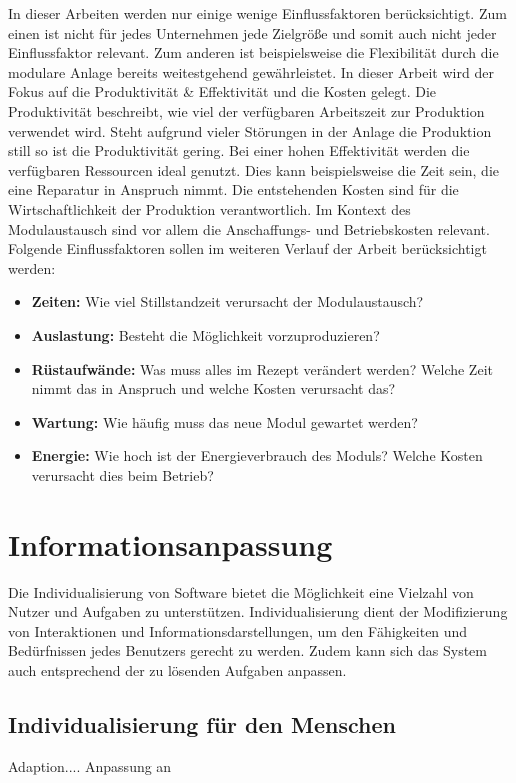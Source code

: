 In dieser Arbeiten werden nur einige wenige Einflussfaktoren berücksichtigt. Zum einen ist nicht für jedes Unternehmen jede Zielgröße und somit auch nicht jeder Einflussfaktor relevant. Zum anderen ist beispielsweise die Flexibilität durch die modulare Anlage bereits weitestgehend gewährleistet. In dieser Arbeit wird der Fokus auf die Produktivität \& Effektivität und die Kosten gelegt. Die Produktivität beschreibt, wie viel der verfügbaren Arbeitszeit zur Produktion verwendet wird. Steht aufgrund vieler Störungen in der Anlage die Produktion still so ist die Produktivität gering. Bei einer hohen Effektivität werden die verfügbaren Ressourcen ideal genutzt. Dies kann beispielsweise die Zeit sein, die eine Reparatur in Anspruch nimmt. Die entstehenden Kosten sind für die Wirtschaftlichkeit der Produktion verantwortlich. Im Kontext des Modulaustausch sind vor allem die Anschaffungs- und Betriebskosten relevant. Folgende Einflussfaktoren sollen im weiteren Verlauf der Arbeit berücksichtigt werden:
\begin{itemize}
\item \textbf{Zeiten:} Wie viel Stillstandzeit verursacht der Modulaustausch?
\item \textbf{Auslastung:} Besteht die Möglichkeit vorzuproduzieren?
\item \textbf{Rüstaufwände:} Was muss alles im Rezept verändert werden? Welche Zeit nimmt das in Anspruch und welche Kosten verursacht das?
\item \textbf{Wartung:} Wie häufig muss das neue Modul gewartet werden?
\item \textbf{Energie:} Wie hoch ist der Energieverbrauch des Moduls? Welche Kosten verursacht dies beim Betrieb?
\end{itemize}

\section{Informationsanpassung}
Die Individualisierung von Software bietet die Möglichkeit eine Vielzahl von Nutzer und Aufgaben zu unterstützen. Individualisierung dient der Modifizierung von Interaktionen und Informationsdarstellungen, um den Fähigkeiten und Bedürfnissen jedes Benutzers gerecht zu werden. Zudem kann sich das System auch entsprechend der zu lösenden Aufgaben anpassen.

\subsection{Individualisierung für den Menschen}
Adaption.... Anpassung an

